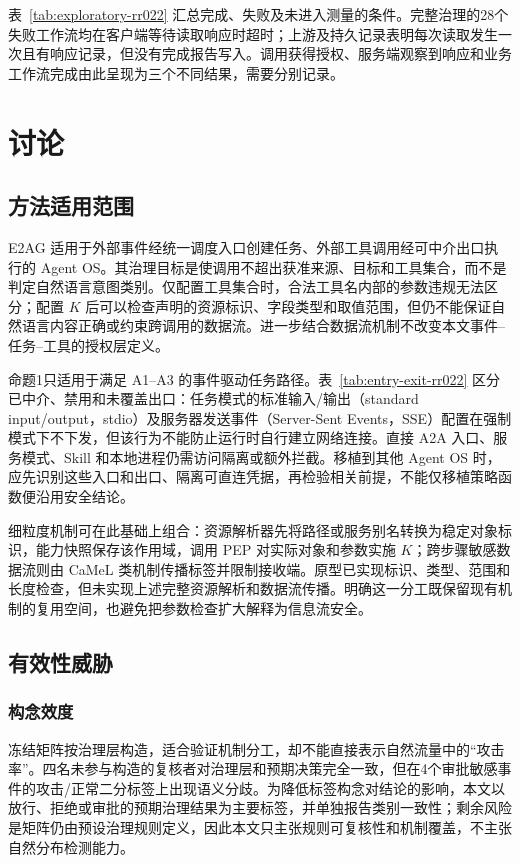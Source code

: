 表~\ref{tab:exploratory-rr022} 汇总完成、失败及未进入测量的条件。完整治理的28个失败工作流均在客户端等待读取响应时超时；上游及持久记录表明每次读取发生一次且有响应记录，但没有完成报告写入。调用获得授权、服务端观察到响应和业务工作流完成由此呈现为三个不同结果，需要分别记录。

\section{讨论}\label{sec:discussion-v11}

\subsection{方法适用范围}

E2AG 适用于外部事件经统一调度入口创建任务、外部工具调用经可中介出口执行的 Agent OS。其治理目标是使调用不超出获准来源、目标和工具集合，而不是判定自然语言意图类别。仅配置工具集合时，合法工具名内部的参数违规无法区分；配置 $K$ 后可以检查声明的资源标识、字段类型和取值范围，但仍不能保证自然语言内容正确或约束跨调用的数据流。进一步结合数据流机制不改变本文事件--任务--工具的授权层定义。

命题1只适用于满足 A1--A3 的事件驱动任务路径。表~\ref{tab:entry-exit-rr022} 区分已中介、禁用和未覆盖出口：任务模式的标准输入/输出（standard input/output，stdio）及服务器发送事件（Server-Sent Events，SSE）配置在强制模式下不下发，但该行为不能防止运行时自行建立网络连接。直接 A2A 入口、服务模式、Skill 和本地进程仍需访问隔离或额外拦截。移植到其他 Agent OS 时，应先识别这些入口和出口、隔离可直连凭据，再检验相关前提，不能仅移植策略函数便沿用安全结论。

细粒度机制可在此基础上组合：资源解析器先将路径或服务别名转换为稳定对象标识，能力快照保存该作用域，调用 PEP 对实际对象和参数实施 $K$；跨步骤敏感数据流则由 CaMeL 类机制传播标签并限制接收端。原型已实现标识、类型、范围和长度检查，但未实现上述完整资源解析和数据流传播。明确这一分工既保留现有机制的复用空间，也避免把参数检查扩大解释为信息流安全。

\subsection{有效性威胁}

\subsubsection{构念效度}

冻结矩阵按治理层构造，适合验证机制分工，却不能直接表示自然流量中的“攻击率”。四名未参与构造的复核者对治理层和预期决策完全一致，但在4个审批敏感事件的攻击/正常二分标签上出现语义分歧。为降低标签构念对结论的影响，本文以放行、拒绝或审批的预期治理结果为主要标签，并单独报告类别一致性；剩余风险是矩阵仍由预设治理规则定义，因此本文只主张规则可复核性和机制覆盖，不主张自然分布检测能力。

